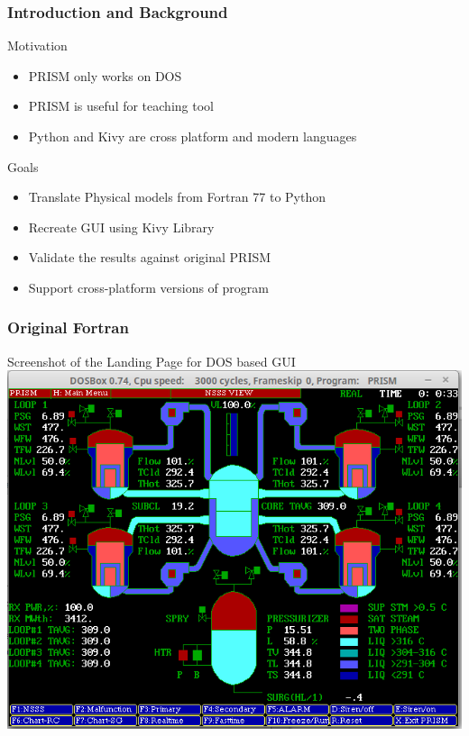 \documentclass[fleqn]{beamer}
\begin{document}
    \begin{frame}
        \frametitle{Introduction and Background}
        \begin{block}{Motivation}
            \begin{itemize}
                \item PRISM only works on DOS
                \item PRISM is useful for teaching tool
                \item Python and Kivy are cross platform and modern languages
            \end{itemize}
        \end{block}
        \begin{block}{Goals}
            \begin{itemize}
                \item Translate Physical models from Fortran 77 to Python
                \item Recreate GUI using Kivy Library
                \item Validate the results against original PRISM
                \item Support cross-platform versions of program
            \end{itemize}
        \end{block}
    \end{frame}
    
    \begin{frame}
        \frametitle{Original Fortran}
        \begin{center}
            Screenshot of the Landing Page for DOS based GUI 
            \includegraphics[trim=0cm 0cm 0cm .85cm, clip=true, totalheight=.8\textheight]{prism}
        \end{center}
    \end{frame}
    
\end{document}
